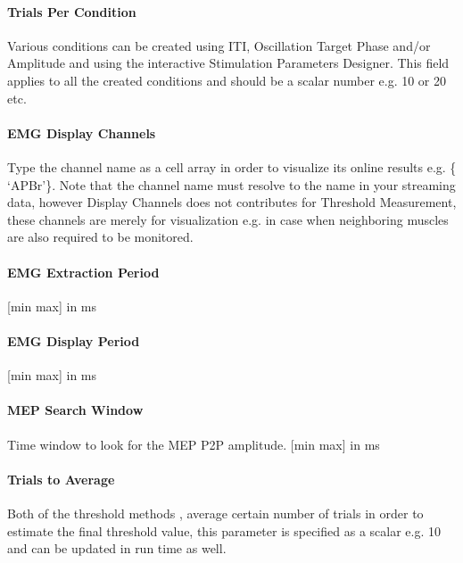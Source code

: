 \documentclass[letterpaper,10pt,english]{sphinxmanual}
\begin{document}
\paragraph{Trials Per Condition}
\label{\detokenize{7_MEPThresholdHunting:trials-per-condition}}
\sphinxAtStartPar
Various conditions can be created using ITI, Oscillation Target Phase and/or Amplitude and using the interactive Stimulation Parameters Designer. This field applies to all the created conditions and should be a scalar number e.g. 10 or 20 etc.


\paragraph{EMG Display Channels}
\label{\detokenize{7_MEPThresholdHunting:emg-display-channels}}
\sphinxAtStartPar
Type the channel name as a cell array in order to visualize its online results e.g. \{ ‘APBr’\}. Note that the channel name must resolve to the name in your streaming data, however Display Channels does not contributes for Threshold Measurement, these channels are merely for visualization e.g. in case when neighboring muscles are also required to be monitored.


\paragraph{EMG Extraction Period}
\label{\detokenize{7_MEPThresholdHunting:emg-extraction-period}}
\sphinxAtStartPar
{[}min max{]} in ms


\paragraph{EMG Display Period}
\label{\detokenize{7_MEPThresholdHunting:emg-display-period}}
\sphinxAtStartPar
{[}min max{]} in ms


\paragraph{MEP Search Window}
\label{\detokenize{7_MEPThresholdHunting:mep-search-window}}
\sphinxAtStartPar
Time window to look for the MEP P2P amplitude. {[}min max{]} in ms


\paragraph{Trials to Average}
\label{\detokenize{7_MEPThresholdHunting:trials-to-average}}
\sphinxAtStartPar
Both of the threshold methods , average certain number of trials in order to estimate the final threshold value, this parameter is specified as a scalar e.g. 10 and can be updated in run time as well.
\end{document}
